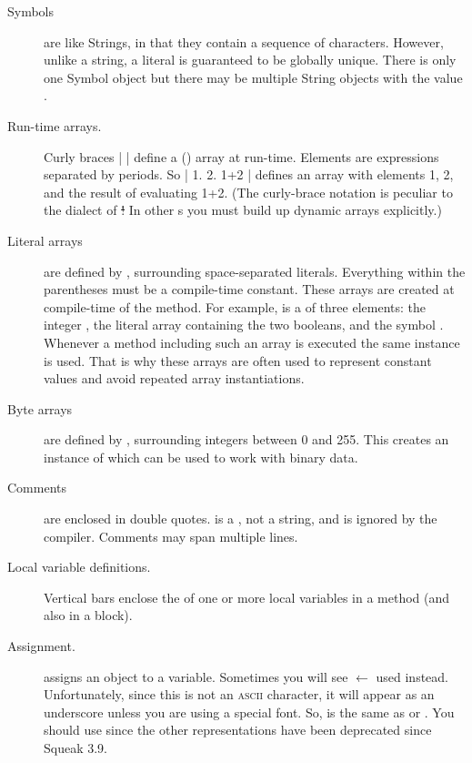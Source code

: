 \documentclass[a4paper,10pt,twoside]{book}
\begin{document}
\begin{description}
\item[Symbols] are like Strings, in that they contain a sequence of characters.  
	However, unlike a string, a literal  is guaranteed to be globally unique.
	There is only one Symbol object  but there may be multiple String objects with the value .

\item[Run-time arrays.]
	Curly braces \ct|{ }| define a () array at run-time.
	Elements are expressions separated by periods.
	So \ct|{ 1. 2. 1+2 }| defines an array with elements 1, 2, and the result of evaluating 1+2.
	(The curly-brace notation is peculiar to the \sq dialect of \st!
	In other \st{}s you must build up dynamic arrays explicitly.)
	
\item[Literal arrays] are defined by \ct{#( )}, surrounding space-separated literals.
	Everything within the parentheses must be a compile-time constant.
	These arrays are created at compile-time of the method.
	For example,  is a   of three elements: the integer , the literal array containing the two booleans, and the symbol .
	Whenever a method including such an array is executed the same instance is used.
	That is why these arrays are often used to represent constant values and avoid repeated array instantiations.

\item[Byte arrays] are defined by \ct{#[ ]}, surrounding integers between 0 and 255.
	This creates an instance of  which can be used to work with binary data.

\item[Comments] are enclosed in double quotes.
	 is a , not a string, and is ignored by the \sq compiler.
	Comments may span multiple lines.
	
\item[Local variable definitions.]
	Vertical bars \ct{| |} enclose the  of one or more local variables in a method (and also in a block).

\item[Assignment.]
	\ct{:=} assigns an object to a variable.
	Sometimes you will see $\leftarrow$ used instead.
	Unfortunately, since this is not an \textsc{ascii} character, it will appear as an underscore unless you are using a special font.
	So,  is the same as  or .
	You should use \ct{:=} since the other representations have been deprecated since Squeak 3.9.


\end{description}
\end{document}

